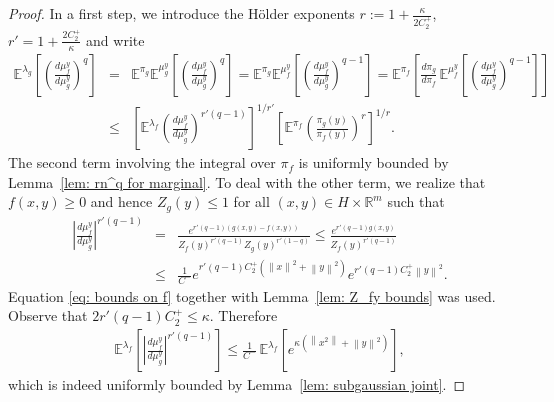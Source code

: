 \documentclass{amsart}
\theoremstyle{definition}
\newcommand{\E}{{\mathbb E}}
\newcommand{\R}{{\mathbb R}}
\newcommand{\norm}[1]{\left\|#1\right\|}
\begin{document}
\begin{proof}
In a first step, we introduce the Hölder exponents $r:= 1 + \frac{\kappa}{2 C_2^+}$, $r' = 1 + \frac{2 C_2^+}{\kappa}$ and write
    \begin{eqnarray*}
         \E^{\lambda_g}  \left[ \left( \frac{ d \mu^y_f}{d \mu_g^y}\right)^q \right] &= &\E^{\pi_g} \E^{\mu_g^y}  \left[ \left( \frac{ d \mu^y_f}{d \mu_g^y}\right)^q \right]=  \E^{\pi_g} \E^{\mu^y_f}  \left[ \left( \frac{ d \mu^y_f}{d \mu_g^y}\right)^{q-1} \right] =  \E^{\pi_f} \left[ \frac{ d \pi_g}{d \pi_f} \, \E^{\mu^y_f}  \left[ \left( \frac{ d \mu^y_f}{d \mu_g^y}\right)^{q-1} \right] \right] \\
         &\le &  \left[ \E^{\lambda_f} \left( \frac{ d \mu^y_f}{d \mu_g^y}\right)^{r'(q-1)} \right]^{1/{r'}} 
        \left[\E^{\pi_f}  \left( \frac{\pi_g(y)}{\pi_f(y)}\right)^{r} \right]^{1/{r}}.
    \end{eqnarray*}
    The second term involving the integral over $\pi_f$ is uniformly bounded by Lemma~\ref{lem: rn^q for marginal}.
    To deal with the other term, we realize that  $f(x,y) \ge 0$ and hence $Z_g(y) \le 1$ for all $(x, y) \in H \times \R^m$ such that
    \begin{eqnarray*}
         \left| \frac{ d \mu^y_f}{d \mu_g^y}\right|^{r'(q-1)} &=& \frac{e^{r' (q-1) (g(x, y)-f(x, y))}}{Z_f(y)^{r'(q-1)} Z_g(y)^{r'(1-q)}} 
         \le  \frac{e^{r' (q-1) g(x, y)}}{Z_f(y)^{r'(q-1)} }  \\
         &\le&  \tfrac{1}{C^-} e^{r' (q-1) C_2^+ (\norm{x}^2 + \norm{y}^2)}
         e^{r'(q-1)C_2^+ \norm{y}^2}.
    \end{eqnarray*}
    Equation \eqref{eq: bounds on f} together with Lemma~\ref{lem: Z_fy bounds} was used.
    Observe that $2 r'(q-1)C_2^+ \le \kappa$. Therefore
    \begin{eqnarray*}
        \E^{\lambda_f} \left[ \left| \frac{ d \mu^y_f}{d \mu_g^y}\right|^{r'(q-1)} \right]  \le \tfrac{1}{C^-} \, \E^{\lambda_f} \left[e^{\kappa (\norm{x^2} + \norm{y}^2)} \right],
        \end{eqnarray*}
    which is indeed uniformly bounded by Lemma~\ref{lem: subgaussian joint}.
\end{proof}
\end{document}
